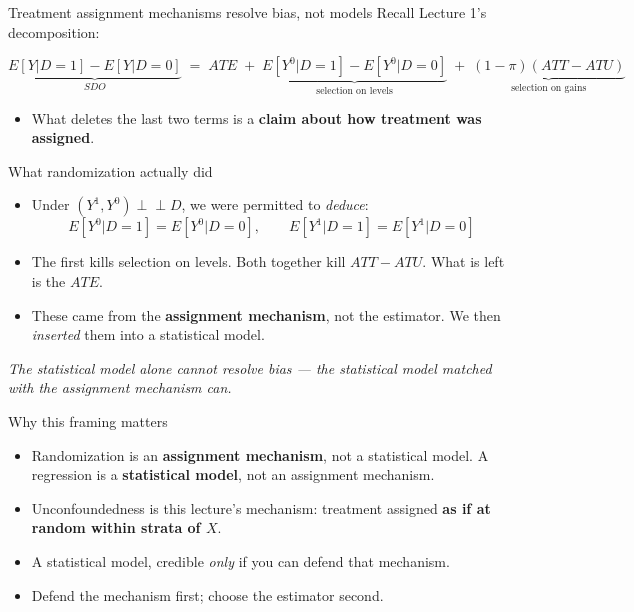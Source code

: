 \documentclass[
  11pt,
  ignorenonframetext,
  aspectratio=169,
]{beamer}
\providecommand{\tightlist}{%
  \setlength{\itemsep}{0pt}\setlength{\parskip}{0pt}}
\newcommand{\indep}{\perp\!\!\!\perp}
\begin{document}
\begin{frame}{Treatment assignment mechanisms resolve bias, not models}
\protect{}\label{treatment-assignment-mechanisms-resolve-bias-not-models}
Recall Lecture 1's decomposition:

\[
\underbrace{E[Y|D{=}1] - E[Y|D{=}0]}_{SDO}
\;=\; ATE
\;+\; \underbrace{E[Y^0|D{=}1] - E[Y^0|D{=}0]}_{\text{selection on levels}}
\;+\; \underbrace{(1-\pi)(ATT - ATU)}_{\text{selection on gains}}
\]

\begin{itemize}
\tightlist
\item
  What deletes the last two terms is a \textbf{claim about how treatment
  was assigned}.
\end{itemize}
\end{frame}

\begin{frame}{What randomization actually did}
\protect{}\label{what-randomization-actually-did}
\begin{itemize}
\tightlist
\item
  Under \((Y^1,Y^0) \indep D\), we were permitted to \emph{deduce}: \[
  E[Y^0|D{=}1] = E[Y^0|D{=}0], \qquad E[Y^1|D{=}1] = E[Y^1|D{=}0]
  \]
\item
  The first kills selection on levels. Both together kill \(ATT - ATU\).
  What is left is the \(ATE\).
\item
  These came from the \textbf{assignment mechanism}, not the estimator.
  We then \emph{inserted} them into a statistical model.
\end{itemize}

\vspace{0.3em}
\begin{center}
\emph{The statistical model alone cannot resolve bias --- the statistical model matched with the assignment mechanism can.}
\end{center}
\end{frame}

\begin{frame}{Why this framing matters}
\protect{}\label{why-this-framing-matters}
\begin{itemize}
\tightlist
\item
  Randomization is an \textbf{assignment mechanism}, not a statistical
  model. A regression is a \textbf{statistical model}, not an assignment
  mechanism.
\item
  Unconfoundedness is this lecture's mechanism: treatment assigned
  \textbf{as if at random within strata of \(X\)}.
\item
  A statistical model, credible \emph{only} if you can defend that
  mechanism.
\item
  Defend the mechanism first; choose the estimator second.
\end{itemize}
\end{frame}
\end{document}
